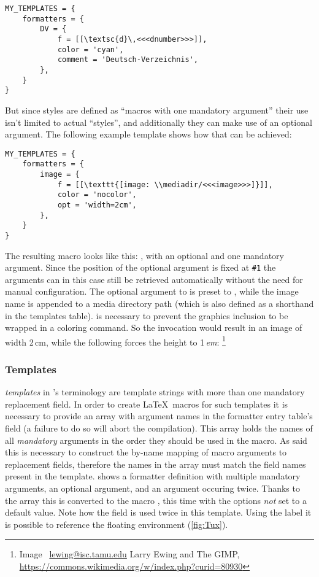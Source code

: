 \documentclass{scrartcl}
\begin{document}
\begin{verbatim}
MY_TEMPLATES = {
    formatters = {
        DV = {
            f = [[\textsc{d}\,<<<dnumber>>>]],
            color = 'cyan',
            comment = 'Deutsch-Verzeichnis',
        },
    }
}
\end{verbatim}

\noindent But since styles are defined as “macros with one mandatory argument”
their use isn't limited to actual “styles”, and additionally they can make use
of an optional argument.  The following example template shows how that can be
achieved:

\begin{verbatim}
MY_TEMPLATES = {
    formatters = {
        image = {
            f = [[\texttt{[image: \\mediadir/<<<image>>>]}]],
            color = 'nocolor',
            opt = 'width=2cm',
        },
    }
}
\end{verbatim}

\noindent The resulting macro looks like this: , with
an optional and one mandatory argument.  Since the position of the optional
argument is fixed at \texttt{\#1} the arguments can in this case still be
retrieved automatically without the need for manual configuration. The optional
argument to  is preset to , while the
image name is appended to a media directory path (which is also defined as a
shorthand in the templates table).   is necessary to prevent
the graphics inclusion to be wrapped in a coloring command. So the invocation
\texttt{} would result in an image of width 2\,cm, while the
following forces the height to 1\,\emph{em}:
%
\footnote{Image \textcopyright\ \url{lewing@isc.tamu.edu} Larry Ewing and The
GIMP, \url{https://commons.wikimedia.org/w/index.php?curid=80930}}


\subsubsection{Templates}
\label{sec:templates-templates}

\emph{templates} in 's terminology are template strings
with more than one mandatory replacement field.  In order to create \LaTeX\
macros for such templates it is necessary to provide an array with argument
names in the formatter entry table's \luavar{args} field (a failure to do so
will abort the compilation).  This array holds the names of all \emph{mandatory}
arguments in the order they should be used in the macro.  As said this is
necessary to construct the by-name mapping of macro arguments to replacement
fields, therefore the names in the array must match the field names present in
the template. \Vref{fig:template} shows a formatter definition with multiple
mandatory arguments, an optional argument, and an argument occuring twice.
Thanks to the \luavar{args} array this is converted to the macro
\luaMacroDocInline{floatImage}, this time with the options \emph{not} set to a
default value.  Note how the \luavar{<<<image>>>} field is used twice in this
template.  Using the label \luavar{fig:Tux} it is possible to reference the
floating environment (\vref{fig:Tux}).
\end{document}
